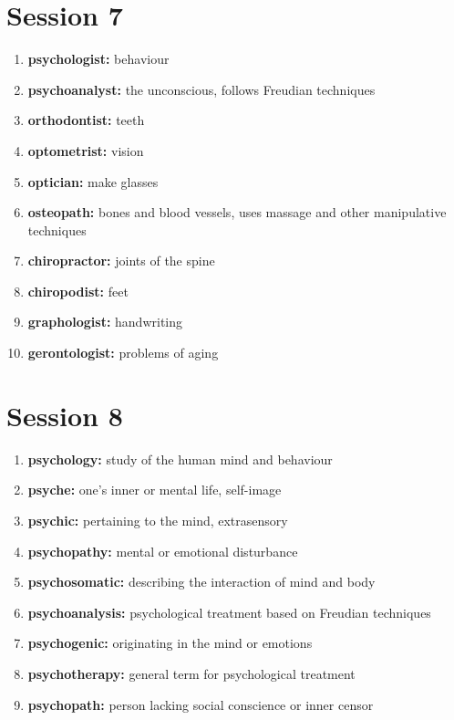 \documentclass{article}
\begin{document}
\section{Session 7}
\begin{enumerate}
    \item \textbf{psychologist: }{behaviour}
    \item \textbf{psychoanalyst: }{the unconscious, follows Freudian techniques}
    \item \textbf{orthodontist: }{teeth}
    \item \textbf{optometrist: }{vision}
    \item \textbf{optician: }{make glasses}
    \item \textbf{osteopath: }{bones and blood vessels, uses massage and other manipulative techniques}
    \item \textbf{chiropractor: }{joints of the spine}
    \item \textbf{chiropodist: }{feet}
    \item \textbf{graphologist: }{handwriting}
    \item \textbf{gerontologist: }{problems of aging}
    
\end{enumerate}

\section{Session 8}
\begin{enumerate}
    \item \textbf{psychology: }{study of the human mind and behaviour}
    \item \textbf{psyche: }{one's inner or mental life, self-image}
    \item \textbf{psychic: }{pertaining to the mind, extrasensory}
    \item \textbf{psychopathy: }{mental or emotional disturbance}
    \item \textbf{psychosomatic: }{describing the interaction of mind and body}
    \item \textbf{psychoanalysis: }{psychological treatment based on Freudian techniques}
    \item \textbf{psychogenic: }{originating in the mind or emotions}
    \item \textbf{psychotherapy: }{general term for psychological treatment}
    \item \textbf{psychopath: }{person lacking social conscience or inner censor}
    
\end{enumerate}
\end{document}
